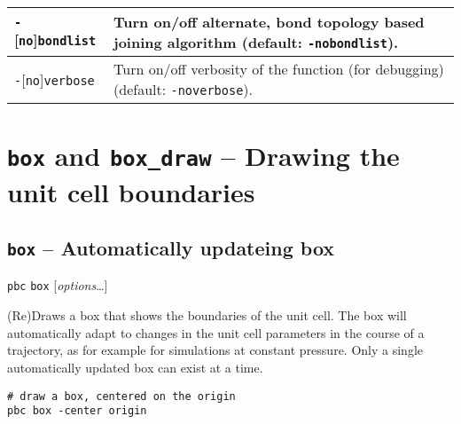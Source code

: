 \documentclass[a4paper, DIV12]{scrartcl}
\begin{document}
\begin{longtable}{|p{}|p{}|}
\texttt{-}[\texttt{no}]\texttt{bondlist}
& Turn on/off alternate, bond topology based joining algorithm (default:
\texttt{-nobondlist}).
\\ \hline

\texttt{-}[\texttt{no}]\texttt{verbose}
& Turn on/off verbosity of the function (for debugging) (default:
\texttt{-noverbose}).
\\ \hline
\end{longtable}

\newpage
\section{\texttt{box} and \texttt{box\_draw} -- Drawing the unit cell boundaries}

\subsection{\texttt{box} -- Automatically updateing box}
\label{sec:box}


\texttt{pbc} \texttt{box} [\textit{options}\dots]


(Re)Draws a box that shows the boundaries of the unit cell. The box
will automatically adapt to changes in the unit cell parameters in the
course of a trajectory, as for example for simulations at constant
pressure. Only a single automatically updated box can exist at a time.


\begin{Verbatim}
# draw a box, centered on the origin
pbc box -center origin
\end{Verbatim}

\end{document}

